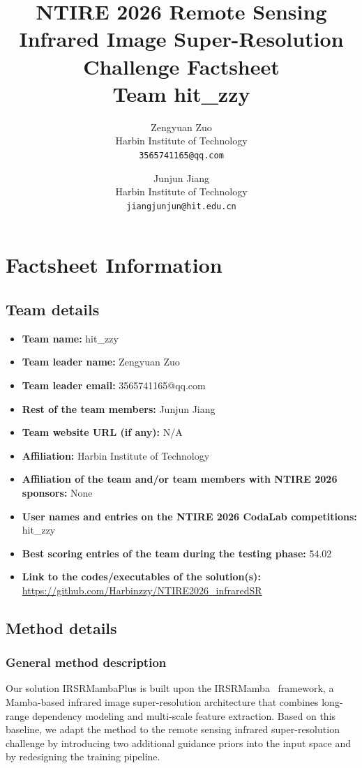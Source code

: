 \documentclass[10pt,twocolumn,letterpaper]{article}
\title{NTIRE 2026 Remote Sensing Infrared Image Super-Resolution Challenge Factsheet\\
Team hit\_zzy}
\author{
Zengyuan Zuo\\
Harbin Institute of Technology\\
{\tt\small 3565741165@qq.com} \and Junjun Jiang\\
Harbin Institute of Technology\\
{\tt\small jiangjunjun@hit.edu.cn}
}
\begin{document}
\maketitle

\section{Factsheet Information}

\subsection{Team details}

\begin{itemize}
    \item \textbf{Team name:} hit\_zzy
    \item \textbf{Team leader name:} Zengyuan Zuo
    \item \textbf{Team leader email:} 3565741165@qq.com
    \item \textbf{Rest of the team members:} Junjun Jiang
    \item \textbf{Team website URL (if any):} N/A
    \item \textbf{Affiliation:} Harbin Institute of Technology
    \item \textbf{Affiliation of the team and/or team members with NTIRE 2026 sponsors:} None
    \item \textbf{User names and entries on the NTIRE 2026 CodaLab competitions:} hit\_zzy
    \item \textbf{Best scoring entries of the team during the testing phase:} 54.02
    \item \textbf{Link to the codes/executables of the solution(s):} \url{https://github.com/Harbinzzy/NTIRE2026_infraredSR}
\end{itemize}

\subsection{Method details}

\subsubsection{General method description}

Our solution IRSRMambaPlus is built upon the IRSRMamba~\cite{huang2025irsrmamba} framework, a Mamba-based infrared image super-resolution architecture that combines long-range dependency modeling and multi-scale feature extraction. Based on this baseline, we adapt the method to the remote sensing infrared super-resolution challenge by introducing two additional guidance priors into the input space and by redesigning the training pipeline.
\end{document}
